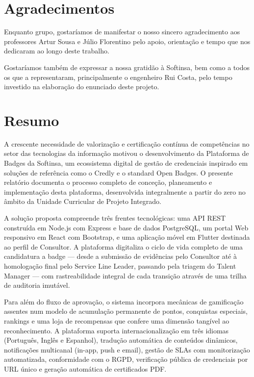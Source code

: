 \documentclass[12pt,a4paper]{report}
\begin{document}

\chapter*{Agradecimentos}

Enquanto grupo, gostaríamos de manifestar o nosso sincero agradecimento aos professores Artur Sousa e Júlio Florentino pelo apoio, orientação e tempo que nos dedicaram ao longo deste trabalho.

Gostaríamos também de expressar a nossa gratidão à Softinsa, bem como a todos os que a representaram, principalmente o engenheiro Rui Costa, pelo tempo investido na elaboração do enunciado deste projeto.

\newpage

\chapter*{Resumo}

A crescente necessidade de valorização e certificação contínua de competências no setor das tecnologias da informação motivou o desenvolvimento da Plataforma de Badges da Softinsa, um ecossistema digital de gestão de credenciais inspirado em soluções de referência como o Credly e o standard Open Badges. O presente relatório documenta o processo completo de conceção, planeamento e implementação desta plataforma, desenvolvida integralmente a partir do zero no âmbito da Unidade Curricular de Projeto Integrado.

A solução proposta compreende três frentes tecnológicas: uma API REST construída em Node.js com Express e base de dados PostgreSQL, um portal Web responsivo em React com Bootstrap, e uma aplicação móvel em Flutter destinada ao perfil de Consultor. A plataforma digitaliza o ciclo de vida completo de uma candidatura a badge --- desde a submissão de evidências pelo Consultor até à homologação final pelo Service Line Leader, passando pela triagem do Talent Manager --- com rastreabilidade integral de cada transição através de uma trilha de auditoria imutável.

Para além do fluxo de aprovação, o sistema incorpora mecânicas de gamificação assentes num modelo de acumulação permanente de pontos, conquistas especiais, rankings e uma loja de recompensas que confere uma dimensão tangível ao reconhecimento. A plataforma suporta internacionalização em três idiomas (Português, Inglês e Espanhol), tradução automática de conteúdos dinâmicos, notificações multicanal (in-app, push e email), gestão de SLAs com monitorização automatizada, conformidade com o RGPD, verificação pública de credenciais por URL único e geração automática de certificados PDF.
\end{document}
